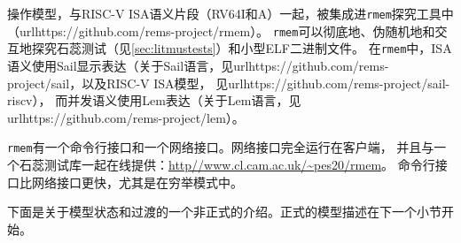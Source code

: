 操作模型，与RISC-V ISA语义片段（RV64I和A）一起，被集成进{\tt rmem}探究工具中（url{https://github.com/rems-project/rmem}）。
{\tt rmem}可以彻底地、伪随机地和交互地探究石蕊测试（见\ref{sec:litmustests}）和小型ELF二进制文件。
在{\tt rmem}中，ISA语义使用Sail显示表达（关于Sail语言，见url{https://github.com/rems-project/sail}，以及RISC-V ISA模型，
见url{https://github.com/rems-project/sail-riscv}），
而并发语义使用Lem表达（关于Lem语言，见url{https://github.com/rems-project/lem}）。

{\tt rmem}有一个命令行接口和一个网络接口。网络接口完全运行在客户端，
并且与一个石蕊测试库一起在线提供：\url{http//www.cl.cam.ac.uk/~pes20/rmem}。
命令行接口比网络接口更快，尤其是在穷举模式中。




下面是关于模型状态和过渡的一个非正式的介绍。正式的模型描述在下一个小节开始。

